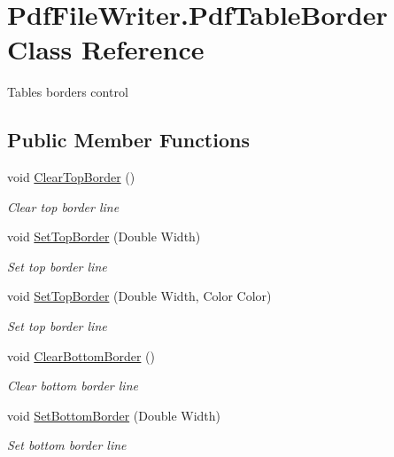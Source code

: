 \hypertarget{class_pdf_file_writer_1_1_pdf_table_border}{}\section{Pdf\+File\+Writer.\+Pdf\+Table\+Border Class Reference}
\label{class_pdf_file_writer_1_1_pdf_table_border}


Table\textquotesingle{}s borders control  


\subsection*{Public Member Functions}
\begin{DoxyCompactItemize}
\item 
void \hyperlink{class_pdf_file_writer_1_1_pdf_table_border_a61b8e8ce7b2d93609bcda63a4bbbe622}{Clear\+Top\+Border} ()
\begin{DoxyCompactList}\small\item\em Clear top border line \end{DoxyCompactList}\item 
void \hyperlink{class_pdf_file_writer_1_1_pdf_table_border_a01bd0b87c353bf9d8e108b943b5b183e}{Set\+Top\+Border} (Double Width)
\begin{DoxyCompactList}\small\item\em Set top border line \end{DoxyCompactList}\item 
void \hyperlink{class_pdf_file_writer_1_1_pdf_table_border_a93738d26ac07bb15841567ca027e1684}{Set\+Top\+Border} (Double Width, Color Color)
\begin{DoxyCompactList}\small\item\em Set top border line \end{DoxyCompactList}\item 
void \hyperlink{class_pdf_file_writer_1_1_pdf_table_border_a343ce89281996ef0aeb1b13c352ef0b0}{Clear\+Bottom\+Border} ()
\begin{DoxyCompactList}\small\item\em Clear bottom border line \end{DoxyCompactList}\item 
void \hyperlink{class_pdf_file_writer_1_1_pdf_table_border_a1e79081c9b461d1484bced6cc73a66c0}{Set\+Bottom\+Border} (Double Width)
\begin{DoxyCompactList}\small\item\em Set bottom border line \end{DoxyCompactList}\item 

\end{DoxyCompactItemize}
